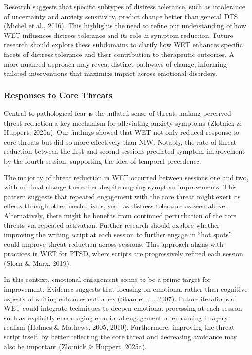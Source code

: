 \documentclass[
  man,floatsintext]{apa7}
\begin{document}
Research suggests that specific subtypes of distress tolerance, such as intolerance of uncertainty and anxiety sensitivity, predict change better than general DTS (Michel et al., 2016).
This highlights the need to refine our understanding of how WET influences distress tolerance and its role in symptom reduction.
Future research should explore these subdomains to clarify how WET enhances specific facets of distress tolerance and their contribution to therapeutic outcomes.
A more nuanced approach may reveal distinct pathways of change, informing tailored interventions that maximize impact across emotional disorders.

\subsubsection{Responses to Core Threats}\label{responses-to-core-threats}

Central to pathological fear is the inflated sense of threat, making perceived threat reduction a key mechanism for alleviating anxiety symptoms (Zlotnick \& Huppert, 2025a).
Our findings showed that WET not only reduced response to core threats but did so more effectively than NIW.
Notably, the rate of threat reduction between the first and second sessions predicted symptom improvement by the fourth session, supporting the idea of temporal precedence.

The majority of threat reduction in WET occurred between sessions one and two, with minimal change thereafter despite ongoing symptom improvements.
This pattern suggests that repeated engagement with the core threat might exert its effects through other mechanisms, such as distress tolerance as seen above.
Alternatively, there might be benefits from continued perturbation of the core threats via repeated activation.
Further research should explore whether improving the writing script at each session to further engage in ``hot spots'' could improve threat reduction across sessions.
This approach aligns with practices in WET for PTSD, where scripts are progressively refined each session (Sloan \& Marx, 2019).

In this context, emotional engagement seems to be a prime target for improvement.
Evidence suggests that focusing on emotional rather than cognitive aspects of writing enhances outcomes (Sloan et al., 2007).
Future iterations of WET could integrate techniques to deepen emotional processing at each session such as explicitly encouraging emotional engagement or enhancing imagery realism (Holmes \& Mathews, 2005, 2010).
Furthermore, improving the threat script itself, by better reflecting the core threat and decreasing avoidance may also be important (Zlotnick \& Huppert, 2025a).
\end{document}
